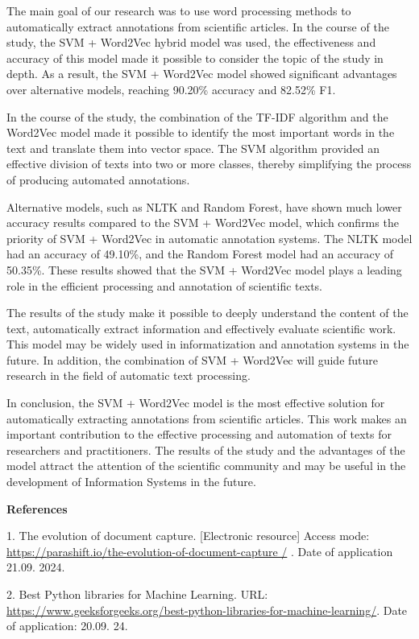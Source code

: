 The main goal of our research was to use word processing methods to
automatically extract annotations from scientific articles. In the
course of the study, the SVM + Word2Vec hybrid model was used, the
effectiveness and accuracy of this model made it possible to consider
the topic of the study in depth. As a result, the SVM + Word2Vec model
showed significant advantages over alternative models, reaching 90.20\%
accuracy and 82.52\% F1.

In the course of the study, the combination of the TF-IDF algorithm and
the Word2Vec model made it possible to identify the most important words
in the text and translate them into vector space. The SVM algorithm
provided an effective division of texts into two or more classes,
thereby simplifying the process of producing automated annotations.

Alternative models, such as NLTK and Random Forest, have shown much
lower accuracy results compared to the SVM + Word2Vec model, which
confirms the priority of SVM + Word2Vec in automatic annotation systems.
The NLTK model had an accuracy of 49.10\%, and the Random Forest model
had an accuracy of 50.35\%. These results showed that the SVM + Word2Vec
model plays a leading role in the efficient processing and annotation of
scientific texts.

The results of the study make it possible to deeply understand the
content of the text, automatically extract information and effectively
evaluate scientific work. This model may be widely used in
informatization and annotation systems in the future. In addition, the
combination of SVM + Word2Vec will guide future research in the field of
automatic text processing.

In conclusion, the SVM + Word2Vec model is the most effective solution
for automatically extracting annotations from scientific articles. This
work makes an important contribution to the effective processing and
automation of texts for researchers and practitioners. The results of
the study and the advantages of the model attract the attention of the
scientific community and may be useful in the development of Information
Systems in the future.

{\bfseries References}

1. The evolution of document capture. {[}Electronic resource{]} Access
mode:
\href{https://parashift.io/the-evolution-of-document-capture\%20/}{https://parashift.io/the-evolution-of-document-capture
/} . Date of application 21.09. 2024.

2. Best Python libraries for Machine Learning. URL:
\url{https://www.geeksforgeeks.org/best-python-libraries-for-machine-learning/}.
Date of application: 20.09. 24.

